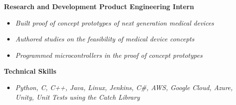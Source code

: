 \documentclass[8pt]{extarticle}
\begin{document}
\textbf{Research and Development Product Engineering Intern} 
\begin{itemize}
\item \textit{Built proof of concept prototypes of next generation medical devices}
\item \textit{Authored studies on the feasibility of medical device concepts}
\item \textit{Programmed microcontrollers in the proof of concept prototypes}

\end{itemize}
\begin{changemargin}{-0.8cm}{0.0cm}


\begin{changemargin}{-0.8cm}{0.0cm}
\textbf{Technical Skills}
\end{changemargin}
\vspace*{-0.4cm}
\makebox[\linewidth]{\rule{17cm}{0.4pt}}
\begin{itemize}
\item \textit{Python, C, C++, Java, Linux, Jenkins, C\#, AWS, Google Cloud, Azure, Unity, Unit Tests using the Catch Library}
\end{itemize}
\end{changemargin}
\end{document}
